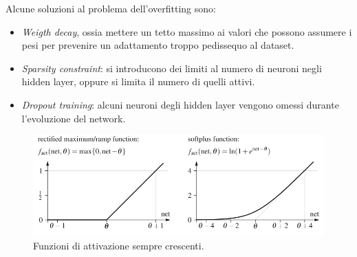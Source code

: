 \documentclass[10pt,a4paper]{article}
\begin{document}
Alcune soluzioni al problema dell'overfitting sono:

\begin{itemize}
\item{\emph{Weigth decay}, ossia mettere un tetto massimo ai valori che possono assumere i pesi per prevenire un adattamento troppo pedissequo al dataset.}
\item{\emph{Sparsity constraint}: si introducono dei limiti al numero di neuroni negli hidden layer, oppure si limita il numero di quelli attivi.}
\item{\emph{Dropout training}: alcuni neuroni degli hidden layer vengono omessi durante l'evoluzione del network.}
\end{itemize}

\begin{figure}
\centering
\includegraphics[scale=0.4]{img/relu.png}
\caption{Funzioni di attivazione sempre crescenti.}
\label{fig:15}
\end{figure}
\end{document}
